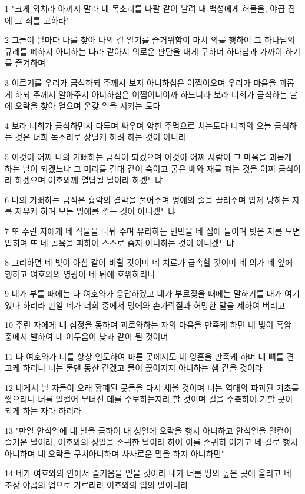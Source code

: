 \par 1 "크게 외치라 아끼지 말라 네 목소리를 나팔 같이 날려 내 백성에게 허물을, 야곱 집에 그 죄를 고하라"
\par 2 그들이 날마다 나를 찾아 나의 길 알기를 즐거워함이 마치 의를 행하여 그 하나님의 규례를 폐하지 아니하는 나라 같아서 의로운 판단을 내게 구하며 하나님과 가까이 하기를 즐겨하며
\par 3 이르기를 우리가 금식하되 주께서 보지 아니하심은 어찜이오며 우리가 마음을 괴롭게 하되 주께서 알아주지 아니하심은 어찜이니이까 하느니라 보라 너희가 금식하는 날에 오락을 찾아 얻으며 온갖 일을 시키는 도다
\par 4 보라 너희가 금식하면서 다투며 싸우며 악한 주먹으로 치는도다 너희의 오늘 금식하는 것은 너희 목소리로 상달케 하려 하는 것이 아니라
\par 5 이것이 어찌 나의 기뻐하는 금식이 되겠으며 이것이 어찌 사람이 그 마음을 괴롭게 하는 날이 되겠느냐 그 머리를 갈대 같이 숙이고 굵은 베와 재를 펴는 것을 어찌 금식이라 하겠으며 여호와께 열납될 날이라 하겠느냐
\par 6 나의 기뻐하는 금식은 흉악의 결박을 풀어주며 멍에의 줄을 끌러주며 압제 당하는 자를 자유케 하며 모든 멍에를 꺾는 것이 아니겠느냐
\par 7 또 주린 자에게 네 식물을 나눠 주며 유리하는 빈민을 네 집에 들이며 벗은 자를 보면 입히며 또 네 골육을 피하여 스스로 숨지 아니하는 것이 아니겠느냐
\par 8 그리하면 네 빛이 아침 같이 비췰 것이며 네 치료가 급속할 것이며 네 의가 네 앞에 행하고 여호와의 영광이 네 뒤에 호위하리니
\par 9 네가 부를 때에는 나 여호와가 응답하겠고 네가 부르짖을 때에는 말하기를 내가 여기 있다 하리라 만일 네가 너희 중에서 멍에와 손가락질과 허망한 말을 제하여 버리고
\par 10 주린 자에게 네 심정을 동하며 괴로와하는 자의 마음을 만족케 하면 네 빛이 흑암 중에서 발하여 네 어두움이 낮과 같이 될 것이며
\par 11 나 여호와가 너를 항상 인도하여 마른 곳에서도 네 영혼을 만족케 하며 네 뼈를 견고케 하리니 너는 물댄 동산 같겠고 물이 끊어지지 아니하는 샘 같을 것이라
\par 12 네게서 날 자들이 오래 황폐된 곳들을 다시 세울 것이며 너는 역대의 파괴된 기초를 쌓으리니 너를 일컬어 무너진 데를 수보하는자라 할 것이며 길을 수축하여 거할 곳이 되게 하는 자라 하리라
\par 13 "만일 안식일에 네 발을 금하여 내 성일에 오락을 행치 아니하고 안식일을 일컬어 즐거운 날이라, 여호와의 성일을 존귀한 날이라 하여 이를 존귀히 여기고 네 길로 행치 아니하며 네 오락을 구치아니하며 사사로운 말을 하지 아니하면"
\par 14 네가 여호와의 안에서 즐거움을 얻을 것이라 내가 너를 땅의 높은 곳에 올리고 네 조상 야곱의 업으로 기르리라 여호와의 입의 말이니라

